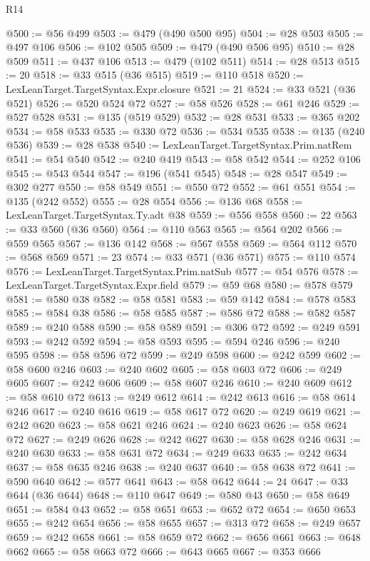 \begin{lexlean}{R14}
\begin{coremodule}
@500 := @56 @499
@503 := @479 (@490 @500 @95)
@504 := @28 @503
@505 := @497 @106
@506 := @102 @505
@509 := @479 (@490 @506 @95)
@510 := @28 @509
@511 := @437 @106
@513 := @479 (@102 @511)
@514 := @28 @513
@515 := 20
@518 := @33 @515 (@36 @515)
@519 := @110 @518
@520 := LexLeanTarget.TargetSyntax.Expr.closure
@521 := 21
@524 := @33 @521 (@36 @521)
@526 := @520 @524 @72
@527 := @58 @526
@528 := @61 @246
@529 := @527 @528
@531 := @135 (@519 @529)
@532 := @28 @531
@533 := @365 @202
@534 := @58 @533
@535 := @330 @72
@536 := @534 @535
@538 := @135 (@240 @536)
@539 := @28 @538
@540 := LexLeanTarget.TargetSyntax.Prim.natRem
@541 := @54 @540
@542 := @240 @419
@543 := @58 @542
@544 := @252 @106
@545 := @543 @544
@547 := @196 (@541 @545)
@548 := @28 @547
@549 := @302 @277
@550 := @58 @549
@551 := @550 @72
@552 := @61 @551
@554 := @135 (@242 @552)
@555 := @28 @554
@556 := @136 @68
@558 := LexLeanTarget.TargetSyntax.Ty.adt @38
@559 := @556 @558
@560 := 22
@563 := @33 @560 (@36 @560)
@564 := @110 @563
@565 := @564 @202
@566 := @559 @565
@567 := @136 @142
@568 := @567 @558
@569 := @564 @112
@570 := @568 @569
@571 := 23
@574 := @33 @571 (@36 @571)
@575 := @110 @574
@576 := LexLeanTarget.TargetSyntax.Prim.natSub
@577 := @54 @576
@578 := LexLeanTarget.TargetSyntax.Expr.field
@579 := @59 @68
@580 := @578 @579
@581 := @580 @38
@582 := @58 @581
@583 := @59 @142
@584 := @578 @583
@585 := @584 @38
@586 := @58 @585
@587 := @586 @72
@588 := @582 @587
@589 := @240 @588
@590 := @58 @589
@591 := @306 @72
@592 := @249 @591
@593 := @242 @592
@594 := @58 @593
@595 := @594 @246
@596 := @240 @595
@598 := @58 @596 @72
@599 := @249 @598
@600 := @242 @599
@602 := @58 @600 @246
@603 := @240 @602
@605 := @58 @603 @72
@606 := @249 @605
@607 := @242 @606
@609 := @58 @607 @246
@610 := @240 @609
@612 := @58 @610 @72
@613 := @249 @612
@614 := @242 @613
@616 := @58 @614 @246
@617 := @240 @616
@619 := @58 @617 @72
@620 := @249 @619
@621 := @242 @620
@623 := @58 @621 @246
@624 := @240 @623
@626 := @58 @624 @72
@627 := @249 @626
@628 := @242 @627
@630 := @58 @628 @246
@631 := @240 @630
@633 := @58 @631 @72
@634 := @249 @633
@635 := @242 @634
@637 := @58 @635 @246
@638 := @240 @637
@640 := @58 @638 @72
@641 := @590 @640
@642 := @577 @641
@643 := @58 @642
@644 := 24
@647 := @33 @644 (@36 @644)
@648 := @110 @647
@649 := @580 @43
@650 := @58 @649
@651 := @584 @43
@652 := @58 @651
@653 := @652 @72
@654 := @650 @653
@655 := @242 @654
@656 := @58 @655
@657 := @313 @72
@658 := @249 @657
@659 := @242 @658
@661 := @58 @659 @72
@662 := @656 @661
@663 := @648 @662
@665 := @58 @663 @72
@666 := @643 @665
@667 := @353 @666

\end{coremodule}
\end{lexlean}
